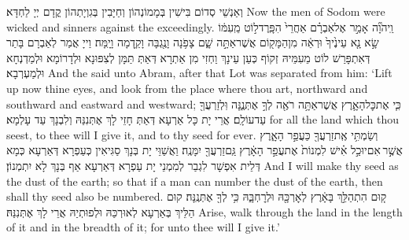 {וְאַנְשֵׁי סְדוֹם בִּישִׁין בְּמָמוֹנְהוֹן וְחַיָּבִין בְּגִוְיָתְהוֹן קֳדָם יְיָ לַחְדָּא׃}
{Now the men of Sodom were wicked and sinners against the \lord\space exceedingly.}{}
{וַֽיהֹוָ֞ה אָמַ֣ר אֶל\maqqaf אַבְרָ֗ם אַחֲרֵי֙ הִפָּֽרֶד\maqqaf ל֣וֹט מֵֽעִמּ֔וֹ שָׂ֣א נָ֤א עֵינֶ֙יךָ֙ וּרְאֵ֔ה מִן\maqqaf הַמָּק֖וֹם אֲשֶׁר\maqqaf אַתָּ֣ה שָׁ֑ם צָפֹ֥נָה וָנֶ֖גְבָּה וָקֵ֥דְמָה וָיָֽמָּה׃}
{וַייָ אֲמַר לְאַבְרָם בָּתַר דְּאִתְפָּרַשׁ לוֹט מֵעִמֵּיהּ זְקוֹף כְּעַן עֵינָךְ וַחְזִי מִן אַתְרָא דְּאַתְּ תַּמָּן לְצִפּוּנָא וּלְדָרוֹמָא וּלְמַדְנְחָא וּלְמַעְרְבָא׃}
{And the \lord\space said unto Abram, after that Lot was separated from him: ‘Lift up now thine eyes, and look from the place where thou art, northward and southward and eastward and westward;}{}
{כִּ֧י אֶת\maqqaf כׇּל\maqqaf הָאָ֛רֶץ אֲשֶׁר\maqqaf אַתָּ֥ה רֹאֶ֖ה לְךָ֣ אֶתְּנֶ֑נָּה וּֽלְזַרְעֲךָ֖ עַד\maqqaf עוֹלָֽם׃}
{אֲרֵי יָת כָּל אַרְעָא דְּאַתְּ חָזֵי לָךְ אֶתְּנִנַּהּ וְלִבְנָךְ עַד עָלְמָא׃}
{for all the land which thou seest, to thee will I give it, and to thy seed for ever.}{}
{וְשַׂמְתִּ֥י אֶֽת\maqqaf זַרְעֲךָ֖ כַּעֲפַ֣ר הָאָ֑רֶץ אֲשֶׁ֣ר \legarmeh  אִם\maqqaf יוּכַ֣ל אִ֗ישׁ לִמְנוֹת֙ אֶת\maqqaf עֲפַ֣ר הָאָ֔רֶץ גַּֽם\maqqaf זַרְעֲךָ֖ יִמָּנֶֽה׃}
{וַאֲשַׁוֵּי יָת בְּנָךְ סַגִּיאִין כְּעַפְרָא דְּאַרְעָא כְּמָא דְּלֵית אִפְשָׁר לִגְבַר לְמִמְנֵי יָת עַפְרָא דְּאַרְעָא אַף בְּנָךְ לָא יִתְמְנוֹן׃}
{And I will make thy seed as the dust of the earth; so that if a man can number the dust of the earth, then shall thy seed also be numbered.}{}
{ק֚וּם הִתְהַלֵּ֣ךְ בָּאָ֔רֶץ לְאׇרְכָּ֖הּ וּלְרׇחְבָּ֑הּ כִּ֥י לְךָ֖ אֶתְּנֶֽנָּה׃}
{קוּם הַלֵּיךְ בְּאַרְעָא לְאוּרְכַּהּ וּלְפוּתְיַהּ אֲרֵי לָךְ אֶתְּנִנַּהּ׃}
{Arise, walk through the land in the length of it and in the breadth of it; for unto thee will I give it.’}{}
